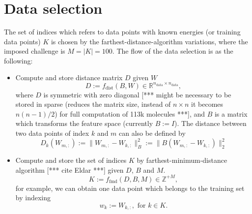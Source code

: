 \documentclass[12pt]{article}
\def\att{                    %
        \marginpar[ \hspace*{\fill} \raisebox{-0.2em}{\rule{2mm}{1.2em}} ]
        {\raisebox{-0.2em}{\rule{2mm}{1.2em}} }
        }
\def\at#1{[*** \att #1 ***]}  %
\begin{document}
\section{Data selection}
The set of indices which refers to data points with known energies (or training data points) $K$ is chosen by the farthest-distance-algorithm variations, where the imposed challenge is $M = |K| = 100$. The flow of the data selection is as the following:
\begin{itemize}
	\item Compute and store distance matrix $D$ given $W$
	\begin{equation}
		D := f_{\text{dist}}(B, W) \in \mathbb{R}^{n_\text{data} \times n_\text{data}},
	\end{equation}
	where $D$ is symmetric with zero diagonal \at{might be necessary to be stored in sparse (reduces the matrix size, instead of $n \times n$ it becomes $n(n-1)/2$) for full computation of 113k molecules}, and $B$ is a matrix which transforms the feature space (currently $B := I$). The distance between two data points of index $k$ and $m$ can also be defined by
	\begin{equation}
		D_k(W_{m,:}) := \|W_{m,:} - W_{k,:}\|^2_B := \|B(W_{m,:} - W_{k,:})\|^2_2
	\end{equation}
	\item Compute and store the set of indices $K$ by farthest-minimum-distance algorithm \at{cite Eldar} given $D$, $B$ and $M$.
	\begin{equation}
		K := f_{\text{fmd}}(D, B, M) \in \mathbb{Z}^{+M},
	\end{equation}
	for example, we can obtain one data point which belongs to the training set by indexing
	\begin{equation}
		w_k := W_{k,:}, \text{ for } k \in K.
	\end{equation}
\end{itemize}
\end{document}
